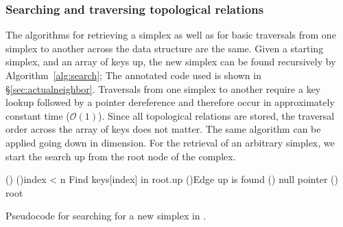 	\subsubsection{Searching and traversing topological relations}

		\par The algorithms for retrieving a simplex as well as for basic traversals from one simplex to another across the data structure are the same.
		Given a starting simplex, and an array of keys up, the new simplex can be found recursively by Algorithm~\ref{alg:search}; The annotated code used is shown in \S\ref{sec:actualneighbor}.
		Traversals from one simplex to another require a key lookup followed by a pointer dereference and therefore occur in approximately constant time ($\mathcal{O}(1)$).
		Since all topological relations are stored, the traversal order across the array of keys does not matter.
		The same algorithm can be applied going down in dimension.
		For the retrieval of an arbitrary simplex, we start the search up from the root node of the complex.

\begin{algorithm}[ht!]


\SetStartEndCondition{ (}{)}{)}
\AlgoDisplayBlockMarkers\AlgoDisplayGroupMarkers\SetAlgoBlockMarkers{ \{}{ \}\ }%
\SetAlgoNoEnd\SetAlgoNoLine\DontPrintSemicolon
\SetStartEndCondition{ (}{)}{)}


\medskip
\Fn(){}{
	\If(){index < n}{
		Find keys[index] in root.up \;
		\eIf(){Edge up is found}{
			\Return {}
		}
		(){
			\Return null pointer
		}
	}
	\lElse(){
		\Return root
	}
}



\caption{Pseudocode for searching for a new simplex in \asc.}
\label{alg:search}
\end{algorithm}
